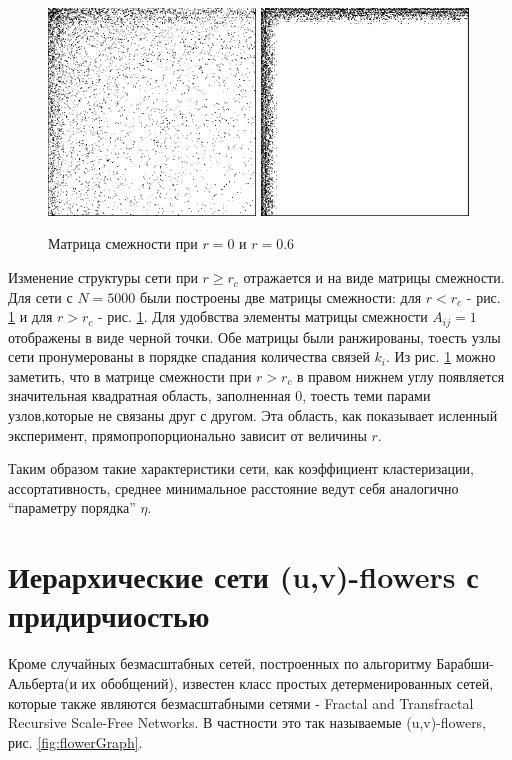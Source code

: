 \documentclass[10pt,aps,pra]{revtex4-1}
\begin{document}
\begin{figure}[H]
\label{fig:baRankedMatrix}
\centering
\includegraphics[height=5.5cm]{graphics/bamatrix.png}
\includegraphics[height=5.5cm]{graphics/bamatrix2.png}
\caption{Матрица смежности при $r=0$ и $r=0.6$}
\end{figure}

Изменение структуры сети при $r \geq r_c$ отражается и на виде матрицы смежности. Для сети с $N=5000$ были построены две матрицы смежности: для $r<r_c$ - рис. \ref{fig:baRankedMatrix} и для $r>r_c$ - рис. \ref{fig:baRankedMatrix}. Для удобвства элементы матрицы смежности $A_{ij}=1$ отображены  в виде черной точки. Обе матрицы были ранжированы, тоесть узлы сети пронумерованы в порядке спадания количества связей $k_i$. Из рис. \ref{fig:baRankedMatrix} можно заметить, что в матрице смежности при $r>r_c$ в правом нижнем углу появляется значительная квадратная область, заполненная 0, тоесть теми парами узлов,которые не связаны друг с другом. Эта область, как показывает исленный эксперимент, прямопропорционально зависит от величины $r$.

Таким образом такие характеристики сети, как коэффициент кластеризации, ассортативность, среднее минимальное расстояние ведут себя аналогично ``параметру порядка'' $\eta$.

\section{Иерархические сети (u,v)-flowers с придирчиостью}
Кроме случайных безмасштабных сетей, построенных по альгоритму Барабши-Альберта(и их обобщений), известен класс простых детерменированных сетей, которые также являются безмасштабными сетями \cite{Rozenfeld2} - Fractal and Transfractal Recursive Scale-Free Networks. В частности это так называемые (u,v)-flowers, рис. \ref{fig:flowerGraph}.
\end{document}
